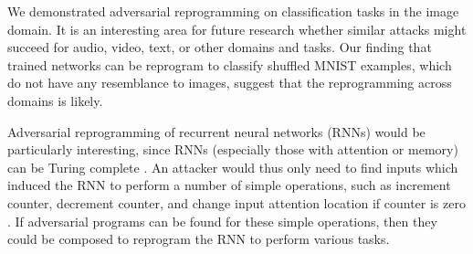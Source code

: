 \documentclass{article}
\begin{document}
We demonstrated adversarial reprogramming on classification tasks in the image domain. 
It is an interesting area for future research whether similar attacks might succeed for audio, video, text, or other domains and tasks. Our finding that trained networks can be reprogram to classify shuffled MNIST examples, which do not have any resemblance to images, suggest that the reprogramming across domains is likely. 

Adversarial reprogramming of recurrent neural networks (RNNs) would be particularly interesting, since RNNs (especially those with attention or memory) can be Turing complete \citep{neelakantan2015neural}. 
An attacker would thus only need to find inputs which induced the RNN to perform a number of simple operations, such as increment counter, decrement counter, and change input attention location if counter is zero \citep{minsky1961recursive}. 
If adversarial programs can be found for these simple operations, then they could be composed to reprogram the RNN to perform various tasks.

\end{document}
